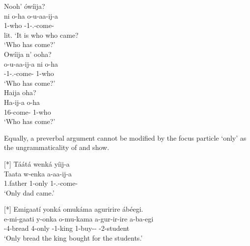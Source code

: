 \documentclass[output=paper]{langscibook}
\begin{document}
\ea
\label{bkm:Ref118629450}
\ea
\label{bkm:Ref118629450:a}
Nooh’ ówíija?\\
\gll
ni  o-ha  o-u-aa-ij-a\\
\COP{}  1-who  \AUG{}-1\RM{}-\N{}.\PST{}-{}come-\FV{}\\
\glt
lit. ‘It is who who came?\\
‘Who has come?’\\


\ex
\label{bkm:Ref118629450:b}
Owíija n’ ooha?\\
\gll
o-u-aa-ij-a  ni  o-ha\\
\AUG{}-1\RM{}-\N{}.\PST{}-come-\FV{}  \COP{}  1-who\\
\glt
‘Who has come?’\\

\ex
\label{bkm:Ref118629450:c}
Haija oha?\\
\gll
Ha-ij-a  o-ha\\
16\SM{}-come-\FV{}  1-who\\
\glt
‘Who has come?'\\

\z
\z

Equally, a preverbal argument cannot be modified by the focus particle ‘only’ as the ungrammaticality of  and  show.

\ea
[*]{
\label{bkm:Ref105432915}
Táátá wenká yíij-a\\
\gll
  Taata  w-enka  a-aa-ij-a\\
  1.father  1-only  1\SM{}-\N{}.\PST{}-come-\FV{}\\
\glt
  ‘Only dad came.’\\
}


\z

\ea
[*]{
\label{bkm:Ref105432947}
Emigaatí  yonká  omukáma  aguririre  ábéegi.\\
\gll
e-mi-gaati  y-onka  o-mu-kama  a-gur-ir-ire  a-ba-egi\\
\AUG{}-4-bread  4-only  \AUG{}-1-king  1\SM{}-buy-\APPL{}-\PFV{}  \AUG{}-2-student\\
\glt
`Only bread the king bought for the students.’\\
}
\end{document}
